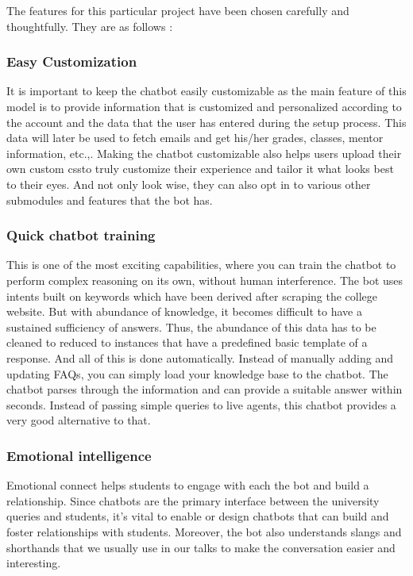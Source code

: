 \documentclass[14pt]{extarticle}
\begin{document}
The features for this particular project have been chosen carefully and thoughtfully. They are as follows :

\subsubsection {Easy Customization}

It is important to keep the chatbot easily customizable as the main feature of this model is to provide information that is customized and personalized according to the account and the data that the user has entered during the setup process. This data will later be used to fetch emails and get his/her grades, classes, mentor information, etc.,. Making the chatbot customizable also helps users upload their own custom cssto truly customize their experience and tailor it what looks best to their eyes. And not only look wise, they can also opt in to various other submodules and features that the bot has.

\subsubsection {Quick chatbot training}

This is one of the most exciting capabilities, where you can train the chatbot to perform complex reasoning on its own, without human interference. The bot uses intents built on keywords which have been derived after scraping the college website. But with abundance of knowledge, it becomes difficult to have a sustained sufficiency of answers. Thus, the abundance of this data has to be cleaned to reduced to instances that have a predefined basic template of a response. And all of this is done automatically. Instead of manually adding and updating FAQs, you can simply load your knowledge base to the chatbot. The chatbot parses through the information and can provide a suitable answer within seconds. Instead of passing simple queries to live agents, this chatbot provides a very good alternative to that.

\subsubsection{Emotional intelligence}

Emotional connect helps students to engage with each the bot and build a relationship. Since chatbots are the primary interface between the university queries and students, it's vital to enable or design chatbots that can build and foster relationships with students. Moreover, the bot also understands slangs and shorthands that we usually use in our talks to make the conversation easier and interesting.
\end{document}
